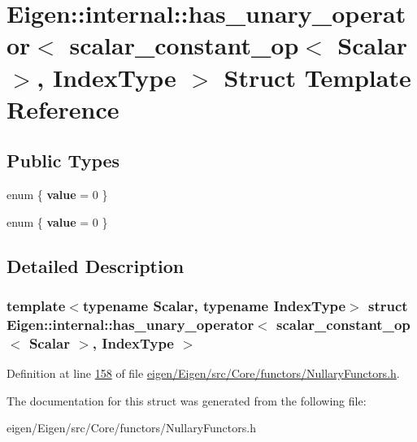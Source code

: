 \hypertarget{struct_eigen_1_1internal_1_1has__unary__operator_3_01scalar__constant__op_3_01_scalar_01_4_00_01_index_type_01_4}{}\section{Eigen\+:\+:internal\+:\+:has\+\_\+unary\+\_\+operator$<$ scalar\+\_\+constant\+\_\+op$<$ Scalar $>$, Index\+Type $>$ Struct Template Reference}
\label{struct_eigen_1_1internal_1_1has__unary__operator_3_01scalar__constant__op_3_01_scalar_01_4_00_01_index_type_01_4}
\subsection*{Public Types}
\begin{DoxyCompactItemize}
\item 
\mbox{\label{struct_eigen_1_1internal_1_1has__unary__operator_3_01scalar__constant__op_3_01_scalar_01_4_00_01_index_type_01_4_a74497fff92be9c87c6edff4ca6b599ef}} 
enum \{ {\bfseries value} = 0
 \}
\item 
\mbox{\label{struct_eigen_1_1internal_1_1has__unary__operator_3_01scalar__constant__op_3_01_scalar_01_4_00_01_index_type_01_4_aa50777292a42277b6021d9924b6bdb18}} 
enum \{ {\bfseries value} = 0
 \}
\end{DoxyCompactItemize}


\subsection{Detailed Description}
\subsubsection*{template$<$typename Scalar, typename Index\+Type$>$\newline
struct Eigen\+::internal\+::has\+\_\+unary\+\_\+operator$<$ scalar\+\_\+constant\+\_\+op$<$ Scalar $>$, Index\+Type $>$}



Definition at line \hyperlink{eigen_2_eigen_2src_2_core_2functors_2_nullary_functors_8h_source_l00158}{158} of file \hyperlink{eigen_2_eigen_2src_2_core_2functors_2_nullary_functors_8h_source}{eigen/\+Eigen/src/\+Core/functors/\+Nullary\+Functors.\+h}.



The documentation for this struct was generated from the following file\+:\begin{DoxyCompactItemize}
\item 
eigen/\+Eigen/src/\+Core/functors/\+Nullary\+Functors.\+h\end{DoxyCompactItemize}
